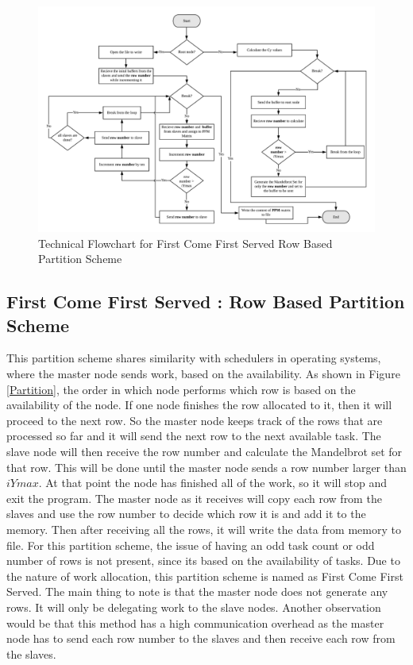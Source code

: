 \documentclass[conference]{IEEEtran}
\begin{document}
		
			\begin{figure}[ht]
				\centering
				\includegraphics[width=7in]{FCFS}
				\caption{Technical Flowchart for First Come First Served Row Based Partition Scheme}
				\label{FCFS_i}
			\end{figure}
			
			\subsection{First Come First Served : Row Based Partition Scheme}\label{FCFS}
			This partition scheme shares similarity with schedulers in operating systems, where the master node sends work, based on the availability. As shown in Figure \ref{Partition}, the order in which node performs which row is based on the availability of the node. If one node finishes the row allocated to it, then it will proceed to the next row. So the master node keeps track of the rows that are processed so far and it will send the next row to the next available task. The slave node will then receive the row number and calculate the Mandelbrot set for that row. This will be done until the master node sends a row number larger than $iYmax$. At that point the node has finished all of the work, so it will stop and exit the program. The master node as it receives will copy each row from the slaves and use the row number to decide which row it is and add it to the memory. Then after receiving all the rows, it will write the data from memory to file. For this partition scheme, the issue of having an odd task count or odd number of rows is not present, since its based on the availability of tasks. 
			Due to the nature of work allocation, this partition scheme is named as First Come First Served. The main thing to note is that the master node does not generate any rows. It will only be delegating work to the slave nodes. Another observation would be that this method has a high communication overhead as the master node has to send each row number to the slaves and then receive each row from the slaves.
			
\end{document}
